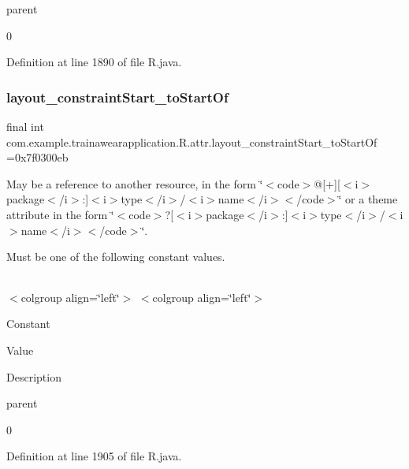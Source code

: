 parent

0

Definition at line 1890 of file R.\+java.

\mbox{\label{classcom_1_1example_1_1trainawearapplication_1_1_r_1_1attr_a10b6f4835baff9f8fdef56ee07a31091}} 
\subsubsection{\texorpdfstring{layout\_constraintStart\_toStartOf}{layout\_constraintStart\_toStartOf}}
{\footnotesize\ttfamily final int com.\+example.\+trainawearapplication.\+R.\+attr.\+layout\+\_\+constraint\+Start\+\_\+to\+Start\+Of =0x7f0300eb\hspace{0.3cm}{\ttfamily [static]}}

May be a reference to another resource, in the form \char`\"{}$<$code$>$@\mbox{[}+\mbox{]}\mbox{[}$<$i$>$package$<$/i$>$\+:\mbox{]}$<$i$>$type$<$/i$>$/$<$i$>$name$<$/i$>$$<$/code$>$\char`\"{} or a theme attribute in the form \char`\"{}$<$code$>$?\mbox{[}$<$i$>$package$<$/i$>$\+:\mbox{]}$<$i$>$type$<$/i$>$/$<$i$>$name$<$/i$>$$<$/code$>$\char`\"{}. 

Must be one of the following constant values.

\tabulinesep=1mm
\begin{longtabu}spread 0pt [c]{*{0}{|X[-1]}|}
\hline
\end{longtabu}
$<$colgroup align=\char`\"{}left\char`\"{}$>$ $<$colgroup align=\char`\"{}left\char`\"{}$>$ 

Constant

Value

Description 

parent

0

Definition at line 1905 of file R.\+java.

\mbox{\label{classcom_1_1example_1_1trainawearapplication_1_1_r_1_1attr_aeb27640017a58164c73acb56c40d7653}} 
